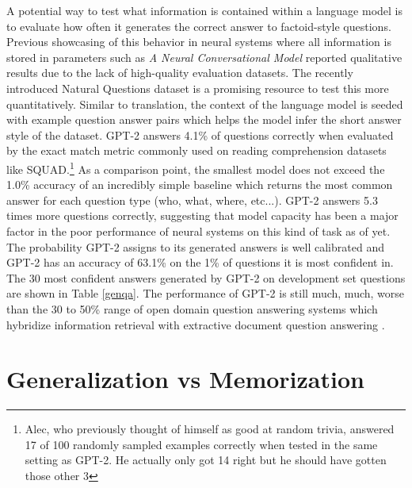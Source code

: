 \documentclass{article}
\begin{document}
A potential way to test what information is contained within a language model is to evaluate how often it generates the correct answer to factoid-style questions. Previous showcasing of this behavior in neural systems where all information is stored in parameters such as \textit{A Neural Conversational Model} \cite{vinyals2015neural} reported qualitative results due to the lack of high-quality evaluation datasets. The recently introduced Natural Questions dataset \cite{kwiatkowski2019natural} is a promising resource to test this more quantitatively. Similar to translation, the context of the language model is seeded with example question answer pairs which helps the model infer the short answer style of the dataset. GPT-2 answers 4.1\% of questions correctly when evaluated by the exact match metric commonly used on reading comprehension datasets like SQUAD.\footnote{Alec, who previously thought of himself as good at random trivia, answered 17 of 100 randomly sampled examples correctly when tested in the same setting as GPT-2. \tiny{He actually only got 14 right but he should have gotten those other 3}} As a comparison point, the smallest model does not exceed the 1.0\% accuracy of an incredibly simple baseline which returns the most common answer for each question type (who, what, where, etc...). GPT-2 answers 5.3 times more questions correctly, suggesting that model capacity has been a major factor in the poor performance of  neural systems on this kind of task as of yet. The probability GPT-2 assigns to its generated answers is well calibrated and GPT-2 has an accuracy of 63.1\% on the 1\% of questions it is most confident in. The 30 most confident answers generated by GPT-2 on development set questions are shown in Table \ref{genqa}. The performance of GPT-2 is still much, much, worse than the 30 to 50\% range of open domain question answering systems which hybridize information retrieval with extractive document question answering \cite{alberti2019bert}.



\section{Generalization vs Memorization}
\label{genvsmem}
\end{document}
